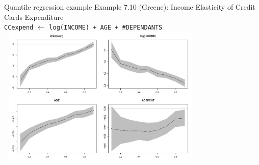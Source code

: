 \documentclass{beamer}
\begin{document}
\begin{frame}{Quantile regression example}
Example 7.10 (Greene): Income Elasticity of Credit Cards Expenditure\\
\medskip
\texttt{CCexpend} $\leftarrow$ \texttt{log(INCOME) + AGE + \#DEPENDANTS}
\centering
\includegraphics[width=10cm, height=6.7cm]{IMG/QREG.pdf}
\end{frame}
\end{document}
